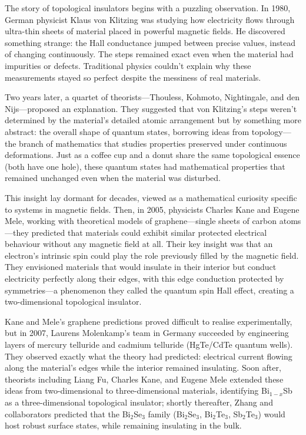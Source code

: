 \begin{historical}
The story of topological insulators begins with a puzzling observation. In 1980, German physicist Klaus von Klitzing was studying how electricity flows through ultra-thin sheets of material placed in powerful magnetic fields. He discovered something strange: the Hall conductance jumped between precise values, instead of changing continuously. The steps remained exact even when the material had impurities or defects. Traditional physics couldn't explain why these measurements stayed so perfect despite the messiness of real materials.

Two years later, a quartet of theorists—Thouless, Kohmoto, Nightingale, and den Nijs—proposed an explanation. They suggested that von Klitzing's steps weren't determined by the material's detailed atomic arrangement but by something more abstract: the overall \QSOpen{}shape\QSClose{} of quantum states, borrowing ideas from topology—the branch of mathematics that studies properties preserved under continuous deformations. Just as a coffee cup and a donut share the same topological essence (both have one hole), these quantum states had mathematical properties that remained unchanged even when the material was disturbed.

This insight lay dormant for decades, viewed as a mathematical curiosity specific to systems in magnetic fields. Then, in 2005, physicists Charles Kane and Eugene Mele, working with theoretical models of graphene—single sheets of carbon atoms—they predicted that materials could exhibit similar protected electrical behaviour without any magnetic field at all. Their key insight was that an electron's intrinsic spin could play the role previously filled by the magnetic field. They envisioned materials that would insulate in their interior but conduct electricity perfectly along their edges, with this edge conduction protected by symmetries—a phenomenon they called the quantum spin Hall effect, creating a two-dimensional topological insulator.

Kane and Mele's graphene predictions proved difficult to realise experimentally, but in 2007, Laurens Molenkamp's team in Germany succeeded by engineering layers of mercury telluride and cadmium telluride (HgTe/CdTe quantum wells). They observed exactly what the theory had predicted: electrical current flowing along the material's edges while the interior remained insulating. Soon after, theorists including Liang Fu, Charles Kane, and Eugene Mele extended these ideas from two-dimensional to three-dimensional materials, identifying Bi$_{1-x}$Sb as a three-dimensional topological insulator; shortly thereafter, Zhang and collaborators predicted that the Bi$_2$Se$_3$ family (Bi$_2$Se$_3$, Bi$_2$Te$_3$, Sb$_2$Te$_3$) would host robust surface states, while remaining insulating in the bulk.


\end{historical}
